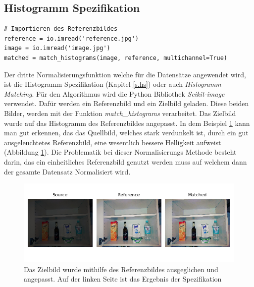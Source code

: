 \subsection{Histogramm Spezifikation}
\begin{lstlisting}
# Importieren des Referenzbildes
reference = io.imread('reference.jpg')
image = io.imread('image.jpg')
matched = match_histograms(image, reference, multichannel=True)
\end{lstlisting}
Der dritte Normalisierungsfunktion welche für die Datensätze angewendet wird, ist die Histogramm Spezifikation (Kapitel \ref{s.hs}) oder auch \textit{Histogramm Matching}. Für den Algorithmus wird die Python Bibliothek \textit{Scikit-image} verwendet. Dafür werden ein Referenzbild und ein Zielbild geladen. Diese beiden Bilder, werden mit der Funktion \textit{match\_histograms} verarbeitet. Das Zielbild wurde auf das Histogramm des Referenzbildes angepasst. In dem Beispiel \ref{img:histogramspez} kann man gut erkennen, das das Quellbild, welches stark verdunkelt ist, durch ein gut ausgeleuchtetes Referenzbild, eine wesentlich bessere Helligkeit aufweist (Abbildung \ref{img:histogramspez}). Die Problematik bei dieser Normalisierungs Methode besteht darin, das ein einheitliches Referenzbild genutzt werden muss auf welchem dann der gesamte Datensatz Normalisiert wird.
\begin{figure}
	[h]
	\centering
	\includegraphics[scale=0.6]{Sources/HS_beispiel.png}
	\caption{Das Zielbild wurde mithilfe des Referenzbildes ausgeglichen und angepasst. Auf der linken Seite ist das Ergebnis der Spezifikation}
	\label{img:histogramspez}
\end{figure}